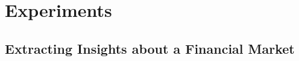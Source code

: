 \chapter{Experiments}
\label{chapter:experiments}

\section{Extracting Insights about a Financial Market}
\label{section:extracting-insights-about-a-financial-market}